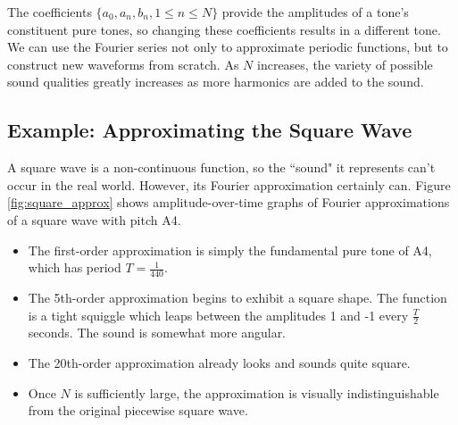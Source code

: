 \par The coefficients $\{a_0,a_n,b_n, 1 \le n \le N\}$ provide the amplitudes of a tone's constituent pure tones, so changing these coefficients results in a different tone. We can use the Fourier series not only to approximate periodic functions, but to construct new waveforms from scratch. As $N$ increases, the variety of possible sound qualities greatly increases as more harmonics are added to the sound.

\newpage

\subsection{Example: Approximating the Square Wave}


\par A square wave is a non-continuous function, so the ``sound" it represents can't occur in the real world. However, its Fourier approximation certainly can. Figure \ref{fig:square_approx} shows amplitude-over-time graphs of Fourier approximations of a square wave with pitch A4.
\begin{itemize}
    \item The first-order approximation is simply the fundamental pure tone of A4, which has period $T = \frac{1}{440}$.
    \item The 5th-order approximation begins to exhibit a square shape. The function is a tight squiggle which leaps between the amplitudes 1 and -1 every $\frac{T}{2}$ seconds. The sound is somewhat more angular.
    \item The 20th-order approximation already looks and sounds quite square.
    \item Once $N$ is sufficiently large, the approximation is visually indistinguishable from the original piecewise square wave.
\end{itemize}

